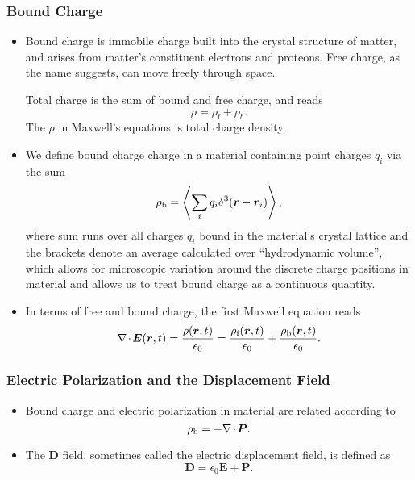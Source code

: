 \documentclass[11pt, a4paper]{article}
\renewcommand{\vec}[1]{\bm{#1}} %
\renewcommand{\r}{\vec{r}}
\newcommand{\E}{\vec{E}} %
\newcommand{\D}{\vec{D}}  %
\renewcommand{\P}{\vec{P}}  %
\newcommand{\ee}{\epsilon_{0}}  %
\renewcommand{\div}{\nabla \mspace{-2mu} \cdot \mspace{-2mu}}
\begin{document}
\subsubsection{Bound Charge}
\begin{itemize}
	\item Bound charge is immobile charge built into the crystal structure of matter, and arises from matter's constituent electrons and proteons. Free charge, as the name suggests, can move freely through space.

    Total charge is the sum of bound and free charge, and reads
    \begin{equation*}
        \rho = \rho_{\text{f}} + \rho_{b}.
    \end{equation*}
	The $ \rho $ in Maxwell's equations is total charge density.
	
	\item We define bound charge charge in a material containing point charges $ q_{i} $ via the sum
	\begin{equation*}
		\rho_{\text{b}} = \ev{\sum_{i}q_{i}\delta^{3}(\r - \r_{i})},
	\end{equation*}
    where sum runs over all charges $ q_{i} $ bound in the material's crystal lattice and the brackets denote an average calculated over ``hydrodynamic volume'', which allows for microscopic variation around the discrete charge positions in material and allows us to treat bound charge as a continuous quantity. 
	
	\item In terms of free and bound charge, the first Maxwell equation reads
	\begin{equation*}
		\div \E (\r, t) = \frac{\rho(\r, t)}{\ee}  = \frac{\rho_{\text{f}}(\r, t)}{\ee} + \frac{\rho_{\text{b}}(\r, t)}{\ee}.
	\end{equation*}
\end{itemize}

\subsubsection{Electric Polarization and the Displacement Field}
\begin{itemize}
	\item Bound charge and electric polarization in material are related according to
	\begin{equation*}
		\rho_{\text{b}} = - \div \P.
	\end{equation*}

    \item The $ \D $ field, sometimes called the electric displacement field, is defined as
    \begin{equation*}
        \D = \ee \E + \P.
    \end{equation*}
\end{itemize}
\end{document}
